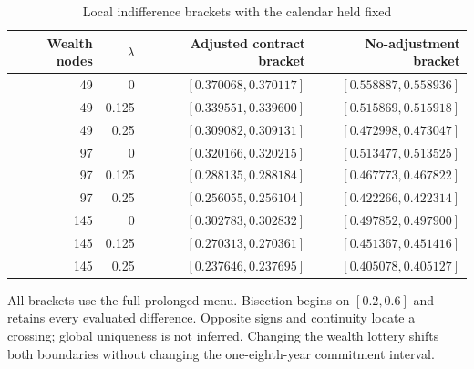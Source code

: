 \begin{table}[htbp]
\centering
\caption{Local indifference brackets with the calendar held fixed}\label{tab:r8_frontiers}
\small
\begin{tabular}{rrrr}
\toprule
Wealth nodes & $\lambda$ & Adjusted contract bracket & No-adjustment bracket \\
\midrule
49 & 0 & $[0.370068, 0.370117]$ & $[0.558887, 0.558936]$ \\
49 & 0.125 & $[0.339551, 0.339600]$ & $[0.515869, 0.515918]$ \\
49 & 0.25 & $[0.309082, 0.309131]$ & $[0.472998, 0.473047]$ \\
97 & 0 & $[0.320166, 0.320215]$ & $[0.513477, 0.513525]$ \\
97 & 0.125 & $[0.288135, 0.288184]$ & $[0.467773, 0.467822]$ \\
97 & 0.25 & $[0.256055, 0.256104]$ & $[0.422266, 0.422314]$ \\
145 & 0 & $[0.302783, 0.302832]$ & $[0.497852, 0.497900]$ \\
145 & 0.125 & $[0.270313, 0.270361]$ & $[0.451367, 0.451416]$ \\
145 & 0.25 & $[0.237646, 0.237695]$ & $[0.405078, 0.405127]$ \\
\bottomrule
\end{tabular}
\par\vspace{3pt}\begin{minipage}{0.96\textwidth}\footnotesize All brackets use the full prolonged menu. Bisection begins on $[0.2,0.6]$ and retains every evaluated difference. Opposite signs and continuity locate a crossing; global uniqueness is not inferred. Changing the wealth lottery shifts both boundaries without changing the one-eighth-year commitment interval.\end{minipage}
\end{table}
